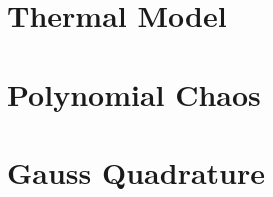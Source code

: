 \renewcommand{\thesection}{S\arabic{section}}
\renewcommand{\thetable}{S\arabic{table}}
\renewcommand{\thefigure}{S\arabic{figure}}
\setcounter{table}{0}
\setcounter{figure}{0}



\section{Thermal Model} 


\section{Polynomial Chaos}
\section{Gauss Quadrature}
